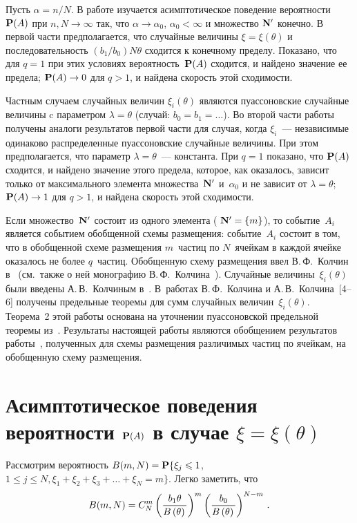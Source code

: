 \begin{multicols}{2}
Пусть $\alpha=n/N$. В работе  изучается асимптотическое
поведение вероятности~${\bf P}(A)$ при $n,N\to\infty$ так, что
$\alpha\to\alpha_0$, $\alpha_0<\infty$ и множество ${\bf N'}$
конечно. В первой части предполагается, что случайные величины
$\xi=\xi(\theta)$ и последовательность $(b_1/b_0)N\theta$
сходится к конечному пределу.  Показано, что для $q=1$ при этих
условиях вероятность~${\bf P}(A)$ сходится, и найдено значение ее
предела; ${\bf P}(A)\to 0$  для $q>1$,  и найдена скорость этой
сходимости.

 Частным случаем случайных величин
$\xi_i(\theta)$ являются пуассоновские случайные величины c
па\-ра\-мет\-ром $\lambda=\theta$ (случай: $b_0=b_1=\dots$). Во второй
части работы получены аналоги результатов первой части  для
случая, когда $\xi_i$~--- независимые одинаково распределенные
пуассоновские случайные величины. При этом предполагается, что
параметр $\lambda=\theta$~--- константа. При $q=1$ показано, что
${\bf P}(A)$ сходится, и найдено значение этого предела, которое,
как оказалось, зависит только от максимального элемента множества~${\bf N'}$
и~$\alpha_0$ и не зависит от $\lambda=\theta$;  ${\bf
P}(A)\to 1$ для $q>1$, и найдена скорость этой сходимости.

Если множество~${\bf N'}$ состоит из одного элемента ( ${\bf
N'}=\{m\}$), то событие~$A_i$ является событием обобщенной схемы
размещения: событие~$A_i$ состоит в том, что в обобщенной схеме
размещения $m$~частиц по $N$~ячейкам в каждой ячейке оказалось не
более $q$~частиц. Обобщенную схему размещения ввел В.\,Ф.~Колчин в~\cite{2ch}
(см.\ также о ней монографию В.\,Ф.~Колчина~\cite{3ch}). Случайные
величины~$\xi_i(\theta)$ были введены А.\,В.~Колчиным  в~\cite{4ch}.
В~работах В.\,Ф.~Колчина  и А.\,В.~Колчина~[4--6] получены предельные
теоремы для сумм случайных величин~$\xi_i(\theta)$. Теорема~2 этой
работы основана на уточнении пуассоновской предельной теоремы из~\cite{4ch}.
Результаты настоящей работы являются обобщением результатов
работы~\cite{7ch}, полученных для схемы размещения различимых частиц по
ячейкам, на обобщенную схему размещения.

\section{Асимптотическое поведения вероятности  ${\bf P}(A)$ в случае
$\xi=\xi(\theta)$}

Рассмотрим вероятность $B(m, N)={\bf P}\{\xi_j\le1$,\linebreak $1\le j\le N,
\xi_1+\xi_2+\xi_3+\dots +\xi_N=m\}$. Легко заметить, что
$$
B(m, N)=C_N^m\left(\fr{b_1\theta}{B\left(\theta\right)}\right)^m
\left(\fr{b_0}{B\left(\theta\right)}\right)^{N-m}\,.
$$


\end{multicols}
